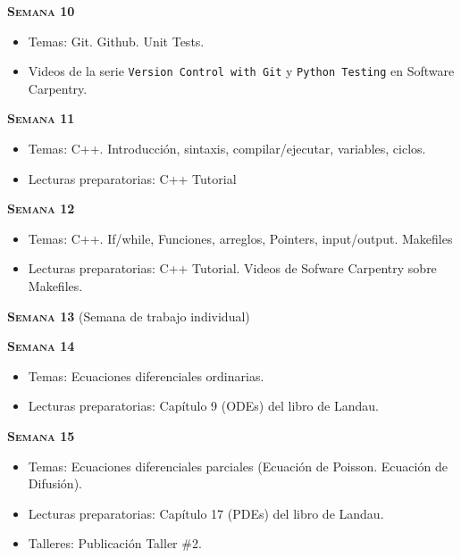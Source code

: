 \documentclass[letterpaper,10pt,onecolumn]{article}
\begin{document}
\noindent\textbf{\textsc{Semana 10}}\\[-0.5cm]
\begin{itemize}
\item Temas: Git. Github. Unit Tests. \\[-0.6cm]
\item Videos de la serie \texttt{Version Control with Git} y
  \texttt{Python Testing}  en Software Carpentry.\\[-0.6cm]    
\end{itemize}

\noindent\textbf{\textsc{Semana 11}}\\[-0.5cm]
\begin{itemize}
\item Temas: C++. Introducción, sintaxis, compilar/ejecutar,
variables, ciclos. \\[-0.6cm]
\item Lecturas preparatorias: C++ Tutorial\\[-0.6cm]
\end{itemize}


\noindent\textbf{\textsc{Semana 12}}\\[-0.5cm]
\begin{itemize}
\item Temas: C++. If/while, Funciones, arreglos, Pointers, input/output. Makefiles \\[-0.6cm]
\item Lecturas preparatorias: C++ Tutorial. Videos de Sofware
  Carpentry sobre Makefiles.\\[-0.6cm]  
\end{itemize}

\noindent\textbf{\textsc{Semana 13}} (Semana de trabajo individual)

\noindent\textbf{\textsc{Semana 14}}\\[-0.5cm]
\begin{itemize}
\item Temas: Ecuaciones diferenciales ordinarias. \\[-0.6cm]
\item Lecturas preparatorias: Cap\'itulo 9 (ODEs) del libro de
  Landau. \\[-0.6cm] 
\end{itemize}

\noindent\textbf{\textsc{Semana 15}}\\[-0.5cm]
\begin{itemize}
\item Temas: Ecuaciones diferenciales parciales (Ecuaci\'on de
  Poisson. Ecuaci\'on de Difusi\'on). \\[-0.6cm]
\item Lecturas preparatorias: Cap\'itulo 17 (PDEs) del libro de
  Landau. \\[-0.6cm] 
\item Talleres: Publicaci\'on Taller \#2. \\[-0.6cm]
\end{itemize}
\end{document}
